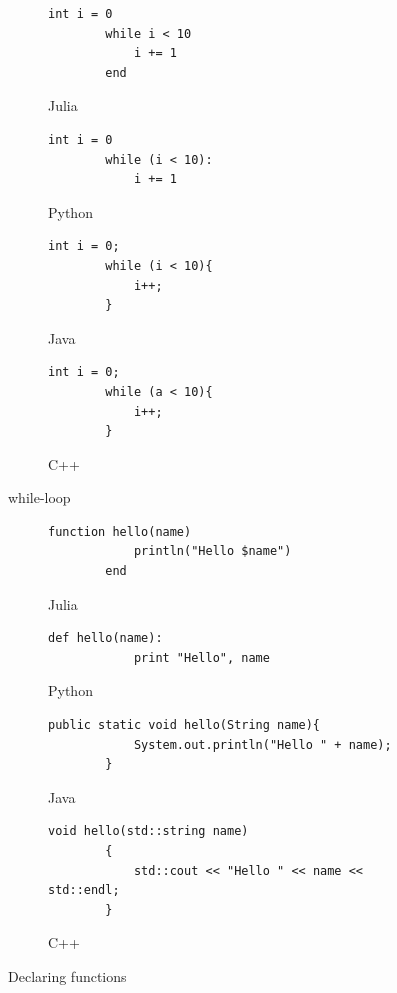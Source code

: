 \documentclass[a4paper, 11pt, titlepage]{article}
\begin{document}
\begin{figure}[H]
	\centering
	\begin{subfigure}[H]{0.7\textwidth}
		\centering
		\begin{lstlisting}[belowskip=0.5mm]
		int i = 0
		while i < 10
			i += 1
		end
		\end{lstlisting}
		\caption{Julia}
	\end{subfigure}
	\begin{subfigure}[H]{0.7\textwidth}
		\centering
		\begin{lstlisting}[belowskip=0.5mm]
		int i = 0
		while (i < 10):
			i += 1
		\end{lstlisting}
		\caption{Python}
	\end{subfigure}	
	\begin{subfigure}[H]{0.7\textwidth}
		\centering
		\begin{lstlisting}[belowskip=0.5mm]
		int i = 0;
		while (i < 10){
			i++;
		}
		\end{lstlisting}
		\caption{Java}
	\end{subfigure}
	\begin{subfigure}[H]{0.7\textwidth}
		\centering
		\begin{lstlisting}[belowskip=0.5mm]
		int i = 0;
		while (a < 10){
			i++;
		}
		\end{lstlisting}
		\caption{C++}
	\end{subfigure}
	\caption{while-loop}
	\label{whileloop}
\end{figure}

\begin{figure}[H]
	\centering
	\begin{subfigure}[H]{0.7\textwidth}
		\centering
		\begin{lstlisting}[belowskip=0.5mm]
		function hello(name)
			println("Hello $name")
		end
		\end{lstlisting}
		\caption{Julia}
	\end{subfigure}
	\begin{subfigure}[H]{0.7\textwidth}
		\centering
		\begin{lstlisting}[belowskip=0.5mm]
		def hello(name):
			print "Hello", name
		\end{lstlisting}
		\caption{Python}
	\end{subfigure}	
	\begin{subfigure}[H]{0.7\textwidth}
		\centering
		\begin{lstlisting}[belowskip=0.5mm]
		public static void hello(String name){
			System.out.println("Hello " + name);
		}
		\end{lstlisting}
		\caption{Java}
	\end{subfigure}
	\begin{subfigure}[H]{0.7\textwidth}
		\centering
		\begin{lstlisting}[belowskip=0.5mm]
		void hello(std::string name)
		{
			std::cout << "Hello " << name << std::endl;
		}
		\end{lstlisting}
		\caption{C++}
	\end{subfigure}
	\caption{Declaring functions}
	\label{function}
\end{figure}
\end{document}
